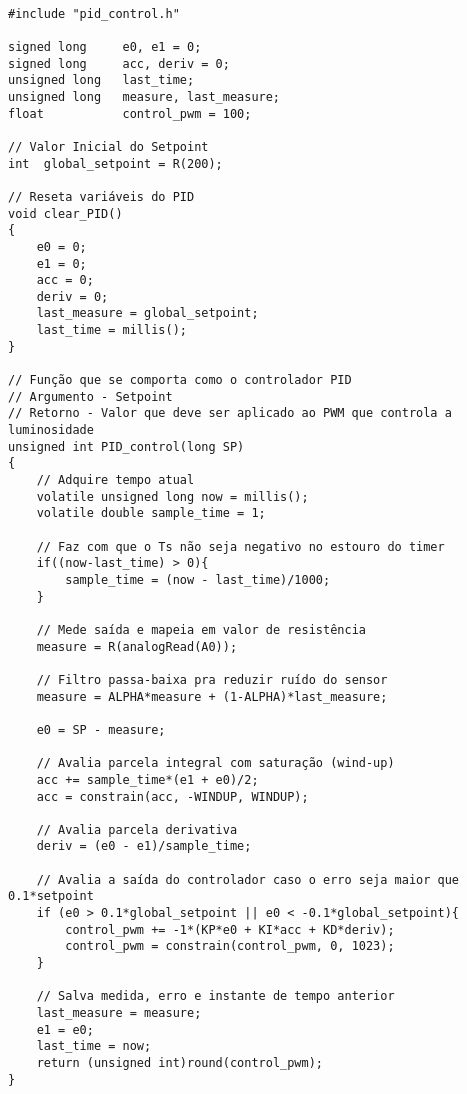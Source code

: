 \begin{lstlisting}

#include "pid_control.h"

signed long     e0, e1 = 0;
signed long     acc, deriv = 0;
unsigned long   last_time;
unsigned long   measure, last_measure;
float           control_pwm = 100;

// Valor Inicial do Setpoint
int  global_setpoint = R(200);

// Reseta variáveis do PID
void clear_PID()
{
    e0 = 0;
    e1 = 0;
    acc = 0;
    deriv = 0;
    last_measure = global_setpoint;
    last_time = millis();
}

// Função que se comporta como o controlador PID
// Argumento - Setpoint
// Retorno - Valor que deve ser aplicado ao PWM que controla a luminosidade
unsigned int PID_control(long SP)
{
    // Adquire tempo atual
    volatile unsigned long now = millis(); 
    volatile double sample_time = 1;

    // Faz com que o Ts não seja negativo no estouro do timer
    if((now-last_time) > 0){
        sample_time = (now - last_time)/1000;
    }
    
    // Mede saída e mapeia em valor de resistência
    measure = R(analogRead(A0));

    // Filtro passa-baixa pra reduzir ruído do sensor
    measure = ALPHA*measure + (1-ALPHA)*last_measure;

    e0 = SP - measure;
    
    // Avalia parcela integral com saturação (wind-up)
    acc += sample_time*(e1 + e0)/2;
    acc = constrain(acc, -WINDUP, WINDUP);

    // Avalia parcela derivativa
    deriv = (e0 - e1)/sample_time;

    // Avalia a saída do controlador caso o erro seja maior que  0.1*setpoint 
    if (e0 > 0.1*global_setpoint || e0 < -0.1*global_setpoint){
        control_pwm += -1*(KP*e0 + KI*acc + KD*deriv);
        control_pwm = constrain(control_pwm, 0, 1023);
    }

    // Salva medida, erro e instante de tempo anterior
    last_measure = measure;
    e1 = e0;
    last_time = now;
    return (unsigned int)round(control_pwm);
}
\end{lstlisting}

